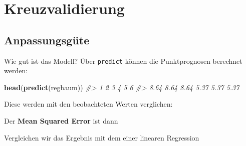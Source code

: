 \documentclass[12pt,]{book}
\makeatletter
\newenvironment{Shaded}{\begin{snugshade}}{\end{snugshade}}
\newcommand{\KeywordTok}[1]{\textcolor[rgb]{0.13,0.29,0.53}{\textbf{{#1}}}}
\newcommand{\DecValTok}[1]{\textcolor[rgb]{0.00,0.00,0.81}{{#1}}}
\newcommand{\StringTok}[1]{\textcolor[rgb]{0.31,0.60,0.02}{{#1}}}
\newcommand{\CommentTok}[1]{\textcolor[rgb]{0.56,0.35,0.01}{\textit{{#1}}}}
\newcommand{\NormalTok}[1]{{#1}}
\newenvironment{kframe}{%
\medskip{}
\setlength{\fboxsep}{.8em}
 \def\at@end@of@kframe{}%
 \ifinner\ifhmode%
  \def\at@end@of@kframe{\end{minipage}}%
  \begin{minipage}{\columnwidth}%
 \fi\fi%
 \def\FrameCommand##1{\hskip\@totalleftmargin \hskip-\fboxsep
 \colorbox{shadecolor}{##1}\hskip-\fboxsep
     \hskip-\linewidth \hskip-\@totalleftmargin \hskip\columnwidth}%
 \MakeFramed {\advance\hsize-\width
   \@totalleftmargin\z@ \linewidth\hsize
   \@setminipage}}%
 {\par\unskip\endMakeFramed%
 \at@end@of@kframe}
\renewenvironment{Shaded}{\begin{kframe}}{\end{kframe}}
\makeatother
\begin{document}
\section{Kreuzvalidierung}\label{kreuzvalidierung}

\subsection{Anpassungsgüte}\label{anpassungsgute}

Wie gut ist das Modell? Über \texttt{predict} können die Punktprognosen
berechnet werden:

\begin{Shaded}
\begin{Highlighting}[]
\KeywordTok{head}\NormalTok{(}\KeywordTok{predict}\NormalTok{(regbaum))}
\CommentTok{#>    1    2    3    4    5    6 }
\CommentTok{#> 8.64 8.64 8.64 5.37 5.37 5.37}
\end{Highlighting}
\end{Shaded}

Diese werden mit den beobachteten Werten verglichen:

\begin{Shaded}
\end{Shaded}

Der \textbf{Mean Squared Error} ist dann

\begin{Shaded}
\end{Shaded}

Vergleichen wir das Ergebnis mit dem einer linearen Regression
\end{document}
